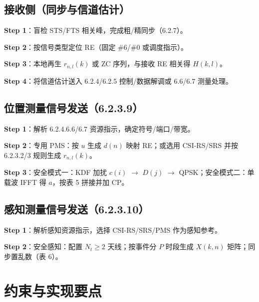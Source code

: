 \documentclass[11pt,a4paper]{ctexart}
\begin{document}
\subsection{接收侧（同步与信道估计）}

\textbf{Step 1}：盲检 STS/FTS 相关峰，完成粗/精同步（6.2.7）。

\textbf{Step 2}：按信号类型定位 RE（固定 \#6/\#0 或调度指示）。

\textbf{Step 3}：本地再生 $r_{n,l}(k)$ 或 ZC 序列，与接收 RE 相关得 $H(k,l)$。

\textbf{Step 4}：将信道估计送入 6.2.4/6.2.5 控制/数据解调或 6.6/6.7 测量处理。

\subsection{位置测量信号发送（6.2.3.9）}

\textbf{Step 1}：解析 6.2.4.6.6/6.7 资源指示，确定符号/端口/带宽。

\textbf{Step 2}：专用 PMS：按 $u$ 生成 $d(n)$ 映射 RE；或选用 CSI-RS/SRS 并按 6.2.3.2/3 规则生成 $r_{n,l}(k)$。

\textbf{Step 3}：安全模式一：KDF 加扰 $c(i)$ $\rightarrow$ $D(j)$ $\rightarrow$ QPSK；安全模式二：单载波 IFFT 得 $a$，按表 5 拼接并加 CP。

\subsection{感知测量信号发送（6.2.3.10）}

\textbf{Step 1}：解析感知资源指示，选择 CSI-RS/SRS/PMS 作为感知参考。

\textbf{Step 2}：安全感知：配置 $N_t\geq 2$ 天线；按事件分 $P$ 时段生成 $X(k,n)$ 矩阵；同步置乱数（表 6）。

\section{约束与实现要点}
\end{document}
